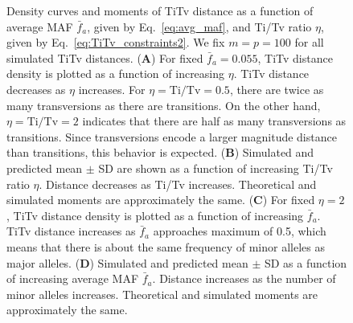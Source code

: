 \documentclass[aos]{imsart}
\begin{document}
\begin{figure}[H]
	\centering
	\caption{Density curves and moments of TiTv distance as a function of average MAF $\bar{f}_a$, given by Eq.~\ref{eq:avg_maf}, and Ti/Tv ratio $\eta$, given by Eq.~\ref{eq:TiTv_constraints2}. We fix $m=p=100$ for all simulated TiTv distances. (\textbf{A}) For fixed $\bar{f}_a=0.055$, TiTv distance density is plotted as a function of increasing $\eta$. TiTv distance decreases as $\eta$ increases. For $\eta=\text{Ti/Tv}=0.5$, there are twice as many transversions as there are transitions. On the other hand, $\eta=\text{Ti/Tv}=2$ indicates that there are half as many transversions as transitions. Since transversions encode a larger magnitude distance than transitions, this behavior is expected. (\textbf{B}) Simulated and predicted mean $\pm$ SD are shown as a function of increasing Ti/Tv ratio $\eta$. Distance decreases as Ti/Tv increases. Theoretical and simulated moments are approximately the same. (\textbf{C}) For fixed $\eta=2$, TiTv distance density is plotted as a function of increasing $\bar{f}_a$. TiTv distance increases as $\bar{f}_a$ approaches maximum of 0.5, which means that there is about the same frequency of minor alleles as major alleles. (\textbf{D}) Simulated and predicted mean $\pm$ SD as a function of increasing average MAF $\bar{f}_a$. Distance increases as the number of minor alleles increases. Theoretical and simulated moments are approximately the same.}\label{fig:TiTv_ridge}
\end{figure}
\end{document}
